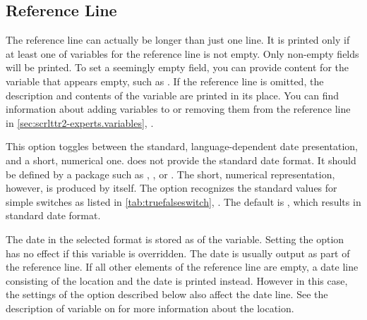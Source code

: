 \subsection{Reference Line}
%
\BeginIndexGroup
{}

The reference line can actually be longer than just one line. It is printed
only if at least one of variables for the reference line is not empty. Only
non-empty fields will be printed. To set a seemingly empty
field, you can provide content for the variable that appears empty, such as
\Parameter{}. If the reference line is omitted, the description
and contents of the  variable are printed in
its place. You can find information about adding variables to or removing them
from the reference line in \autoref{sec:scrlttr2-experts.variables},
.


\begin{Declaration}
\end{Declaration}
This option toggles between the standard, language-dependent
date presentation, and a short, numerical
one. \KOMAScript{} does not provide the standard date format. It should be
defined by a package such as ,
, or
.
The short, numerical
representation, however, is produced by  itself. The option
recognizes the standard values for simple switches as listed in
\autoref{tab:truefalseswitch}, . The default
is , which results in standard date format.

\begin{Declaration}
\end{Declaration}
The date in the selected format is stored as  of the
 variable. Setting the
 option has no effect if this
variable is overridden. The date is usually output as part of the reference
line. If all other elements of the reference line are empty, a date line
consisting of the location and the date is printed instead. However in this
case, the settings of the  option described
below also affect the date line. See the description of variable
 on
 for more information about
the location.
%
\EndIndexGroup
\EndIndexGroup



